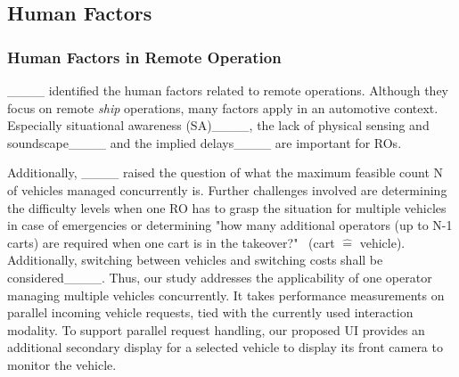 

\subsection{Human Factors}
\label{sec:human_factors}
\subsubsection{Human Factors in Remote Operation}
____ identified the human factors related to remote operations. Although they focus on remote \textit{ship} operations, many factors apply in an automotive context. Especially situational awareness (SA)____, the lack of physical sensing and soundscape____ and the implied delays____ are important for ROs. %

Additionally, ____ raised the question of what the maximum feasible count N of vehicles managed concurrently is. Further challenges involved are determining the difficulty levels when one RO has to grasp the situation for multiple vehicles in case of emergencies or determining "how many additional operators (up to N-1 carts) are required when one cart is in the takeover?"~\cite[p. 6]{hashimoto_human_2022} (cart $\widehat{=}$ vehicle).
Additionally, switching between vehicles and switching costs shall be considered____. Thus, our study addresses the applicability of one operator managing multiple vehicles concurrently. It takes performance measurements on parallel incoming vehicle requests, tied with the currently used interaction modality. To support parallel request handling, our proposed UI provides an additional secondary display for a selected vehicle to display its front camera to monitor the vehicle.

